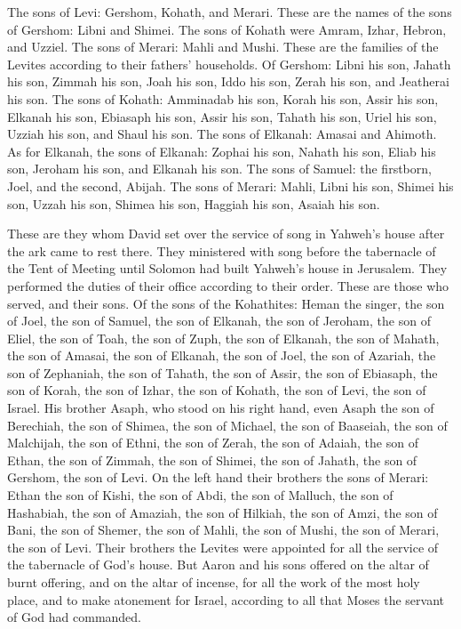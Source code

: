  The sons of Levi: Gershom, Kohath, and Merari.
 These are the names of the sons of Gershom: Libni and
Shimei.  The sons of Kohath were Amram, Izhar, Hebron,
and Uzziel.  The sons of Merari: Mahli and Mushi. These
are the families of the Levites according to their fathers' households.
 Of Gershom: Libni his son, Jahath his son, Zimmah his
son,  Joah his son, Iddo his son, Zerah his son, and
Jeatherai his son.  The sons of Kohath: Amminadab his
son, Korah his son, Assir his son,  Elkanah his son,
Ebiasaph his son, Assir his son,  Tahath his son, Uriel
his son, Uzziah his son, and Shaul his son.  The sons of
Elkanah: Amasai and Ahimoth.  As for Elkanah, the sons of
Elkanah: Zophai his son, Nahath his son,  Eliab his son,
Jeroham his son, and Elkanah his son.  The sons of
Samuel: the firstborn, Joel, and the second, Abijah.  The
sons of Merari: Mahli, Libni his son, Shimei his son, Uzzah his son,
 Shimea his son, Haggiah his son, Asaiah his son.

 These are they whom David set over the service of song
in Yahweh's house after the ark came to rest there.  They
ministered with song before the tabernacle of the Tent of Meeting until
Solomon had built Yahweh's house in Jerusalem. They performed the duties
of their office according to their order.  These are
those who served, and their sons. Of the sons of the Kohathites: Heman
the singer, the son of Joel, the son of Samuel,  the son
of Elkanah, the son of Jeroham, the son of Eliel, the son of Toah,
 the son of Zuph, the son of Elkanah, the son of Mahath,
the son of Amasai,  the son of Elkanah, the son of Joel,
the son of Azariah, the son of Zephaniah,  the son of
Tahath, the son of Assir, the son of Ebiasaph, the son of Korah,
 the son of Izhar, the son of Kohath, the son of Levi,
the son of Israel.  His brother Asaph, who stood on his
right hand, even Asaph the son of Berechiah, the son of Shimea,
 the son of Michael, the son of Baaseiah, the son of
Malchijah,  the son of Ethni, the son of Zerah, the son
of Adaiah,  the son of Ethan, the son of Zimmah, the son
of Shimei,  the son of Jahath, the son of Gershom, the
son of Levi.  On the left hand their brothers the sons of
Merari: Ethan the son of Kishi, the son of Abdi, the son of Malluch,
 the son of Hashabiah, the son of Amaziah, the son of
Hilkiah,  the son of Amzi, the son of Bani, the son of
Shemer,  the son of Mahli, the son of Mushi, the son of
Merari, the son of Levi.  Their brothers the Levites were
appointed for all the service of the tabernacle of God's house.
 But Aaron and his sons offered on the altar of burnt
offering, and on the altar of incense, for all the work of the most holy
place, and to make atonement for Israel, according to all that Moses the
servant of God had commanded.


